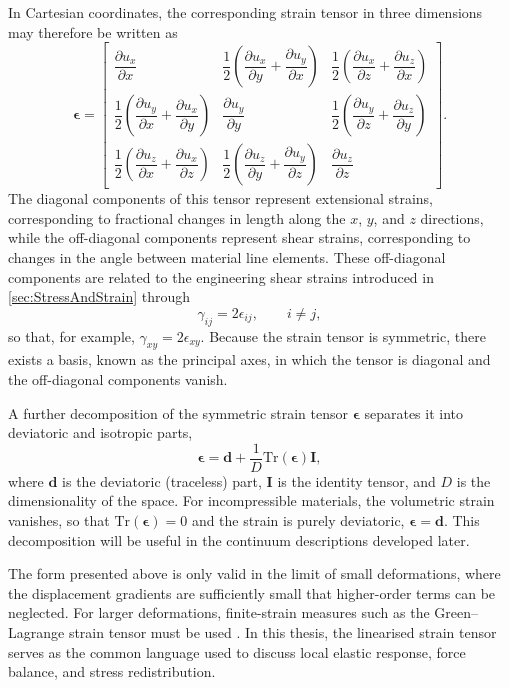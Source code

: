 \documentclass[asymmetricmargins]{library/duthesis}%
\begin{document}
In Cartesian coordinates, the corresponding strain tensor in three dimensions may therefore be written as
\[
    \bm{\epsilon} =
    \begin{bmatrix}
        \dfrac{\partial u_x}{\partial x} & \dfrac{1}{2}\left( \dfrac{\partial u_x}{\partial y} + \dfrac{\partial u_y}{\partial x} \right) & \dfrac{1}{2}\left( \dfrac{\partial u_x}{\partial z} + \dfrac{\partial u_z}{\partial x} \right) \\[6pt]
        \dfrac{1}{2}\left( \dfrac{\partial u_y}{\partial x} + \dfrac{\partial u_x}{\partial y} \right) & \dfrac{\partial u_y}{\partial y} & \dfrac{1}{2}\left( \dfrac{\partial u_y}{\partial z} + \dfrac{\partial u_z}{\partial y} \right) \\[6pt]
        \dfrac{1}{2}\left( \dfrac{\partial u_z}{\partial x} + \dfrac{\partial u_x}{\partial z} \right) & \dfrac{1}{2}\left( \dfrac{\partial u_z}{\partial y} + \dfrac{\partial u_y}{\partial z} \right) & \dfrac{\partial u_z}{\partial z}
    \end{bmatrix}.
\]
The diagonal components of this tensor represent extensional strains, corresponding to fractional changes in length along the $x$, $y$, and $z$ directions, while the off-diagonal components represent shear strains, corresponding to changes in the angle between material line elements. These off-diagonal components are related to the engineering shear strains introduced in \cref{sec:StressAndStrain} through
\begin{equation}
    \gamma_{ij} = 2\epsilon_{ij}, \qquad i \neq j,
    \label{eq:engineeringShearStrain}
\end{equation}
so that, for example, $\gamma_{xy} = 2\epsilon_{xy}$. Because the strain tensor is symmetric, there exists a basis, known as the principal axes, in which the tensor is diagonal and the off-diagonal components vanish.

A further decomposition of the symmetric strain tensor $\bm{\epsilon}$ separates it into deviatoric and isotropic parts,
\[
    \bm{\epsilon} = \bm{d} + \frac{1}{D} \mathrm{Tr}(\bm{\epsilon}) \bm{I},
\]
where $\bm{d}$ is the deviatoric (traceless) part, $\bm{I}$ is the identity tensor, and $D$ is the dimensionality of the space. For incompressible materials, the volumetric strain vanishes, so that $\mathrm{Tr}(\bm{\epsilon}) = 0$ and the strain is purely deviatoric, $\bm{\epsilon} = \bm{d}$. This decomposition will be useful in the continuum descriptions developed later.

The form presented above is only valid in the limit of small deformations, where the displacement gradients are sufficiently small that higher-order terms can be neglected. For larger deformations, finite-strain measures such as the Green–Lagrange strain tensor must be used \cite{TruesdellNoll1992}. In this thesis, the linearised strain tensor serves as the common language used to discuss local elastic response, force balance, and stress redistribution.
\end{document}
